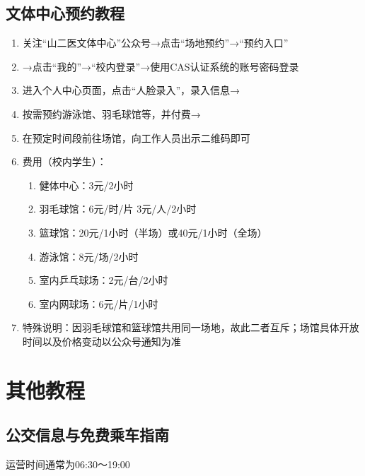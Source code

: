 \subsection[文体中心预约教程]{文体中心预约教程}
\label{sports_center_book}
\begin{enumerate}
    \item 关注“山二医文体中心”公众号→点击“场地预约”→“预约入口”
    \item →点击“我的”→“校内登录”→使用CAS认证系统的账号密码登录
    \item 进入个人中心页面，点击“人脸录入”，录入信息→
    \item 按需预约游泳馆、羽毛球馆等，并付费→
    \item 在预定时间段\footnotemark 前往场馆，向工作人员出示二维码即可
    \item 费用（校内学生）：
          \begin{enumerate}
              \item 健体中心：3元/2小时
              \item 羽毛球馆\footnotemark：6元/时/片 3元/人/2小时
              \item 篮球馆：20元/1小时（半场）或40元/1小时（全场）
              \item 游泳馆\footnotemark：8元/场/2小时
              \item 室内乒乓球场：2元/台/2小时
              \item 室内网球场：6元/片/1小时
          \end{enumerate}
    \item 特殊说明：因羽毛球馆和篮球馆共用同一场地，故此二者互斥；场馆具体开放时间以及价格变动以公众号通知为准
\end{enumerate}

\section[其他教程]{其他教程}
\subsection[公交信息与免费乘车指南]{公交信息与免费乘车指南}
\label{free_bus}
运营时间通常为06:30～19:00

